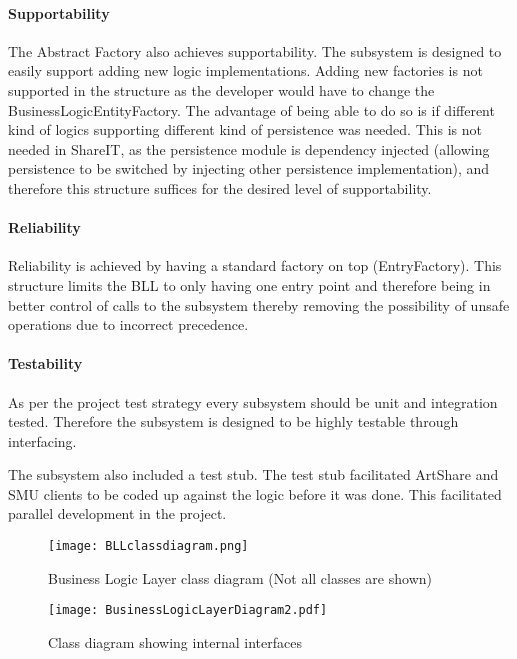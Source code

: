 \documentclass[../report.tex]{subfiles}
\begin{document}
\paragraph{Supportability} 
The Abstract Factory also achieves supportability. The subsystem is designed to easily support adding new logic
implementations. Adding new factories is not supported in the structure as the developer would have to change the BusinessLogicEntityFactory. The advantage of being able to do so is if different kind of logics supporting different kind of persistence was needed. This is not needed in ShareIT, as the persistence module is dependency injected (allowing persistence to be switched by injecting other persistence implementation), and therefore this structure suffices for the desired level of supportability.

\paragraph{Reliability} 
Reliability is achieved by having a standard factory on top (EntryFactory). This structure limits the BLL to only having one entry point and therefore being in better control of calls to the subsystem thereby removing the possibility of unsafe operations due to incorrect precedence. 

\paragraph{Testability}
As per the project test strategy every subsystem should be unit and integration tested. Therefore the subsystem is designed to be highly testable through interfacing.

The subsystem also included a test stub. The test stub facilitated ArtShare and SMU clients to be coded up against the logic before it was done. This facilitated parallel development in the project.

\begin{figure}
\centering
\texttt{[image: BLLclassdiagram.png]}
\caption{Business Logic Layer class diagram (Not all classes are shown)}
\label{fig:BLLclassdiagram}
\end{figure}


\begin{landscape}
\begin{figure}[!h]
\texttt{[image: BusinessLogicLayerDiagram2.pdf]}
\caption{Class diagram showing internal interfaces}
\label{fig:BusinessLogic_InternalInterfaces}
\end{figure}

\end{landscape}
\restoregeometry
\end{document}
